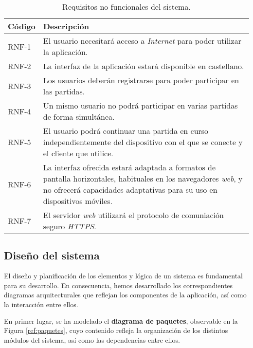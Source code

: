 \documentclass[11pt, a4paper, titlepage]{article}
\begin{document}
\newpage
\begin{table}[h!]
    \centering
    \begin{tabularx}{\textwidth}{|l|X|}
         \hline
         Código & Descripción \\
         \hline
         RNF-1 & El usuario necesitará acceso a \textit{Internet} para poder utilizar la aplicación.\\
         \hline
         RNF-2 & La interfaz de la aplicación estará disponible en castellano.\\
         \hline
         RNF-3 & Los usuarios deberán registrarse para poder participar en las partidas.\\
         \hline
         RNF-4 & Un mismo usuario no podrá participar en varias partidas de forma simultánea. \\
         \hline
         RNF-5 & El usuario podrá continuar una partida en curso independientemente del dispositivo con el que se conecte y el cliente que utilice.\\
         \hline
         RNF-6 & La interfaz ofrecida estará adaptada a formatos de pantalla horizontales, habituales en los navegadores \textit{web}, y no ofrecerá capacidades adaptativas para su uso en dispositivos móviles.\\
         \hline
         RNF-7 & El servidor \textit{web} utilizará el protocolo de comuniación seguro \textit{HTTPS}. \\
         \hline
    \end{tabularx}
    \caption{Requisitos no funcionales del sistema.}
    \label{tab:rnf}
\end{table}

\newpage

\subsection{Diseño del sistema}

El diseño y planificación de los elementos y lógica de un sistema es fundamental para su desarrollo. En consecuencia, hemos desarrollado los correspondientes diagramas arquitecturales que reflejan los componentes de la aplicación, así como la interacción entre ellos. \newline

En primer lugar, se ha modelado el \textbf{diagrama de paquetes}, observable en la Figura \ref{ref:paquetes}, cuyo contenido refleja la organización de los distintos módulos del sistema, así como las dependencias entre ellos. \\ \\
\end{document}
